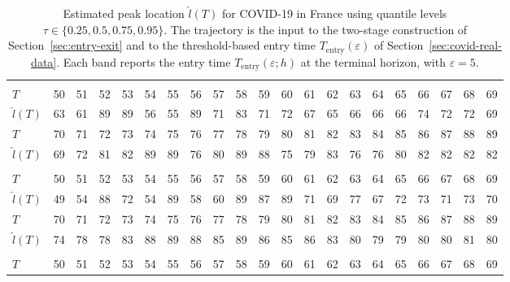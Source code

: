 \documentclass[12pt,a4paper]{article}
\begin{document}
	\begin{landscape}
		\begin{table}[htbp]
			\caption{Estimated peak location $\hat{l}(T)$ for COVID-19 in France using quantile levels $\tau\in\{0.25,0.5,0.75,0.95\}$. The trajectory is the input to the two-stage construction of Section~\ref{sec:entry-exit} and to the threshold-based entry time $T_{\mathrm{entry}}(\varepsilon)$ of Section~\ref{sec:covid-real-data}. Each band reports the entry time $T_{\mathrm{entry}}(\varepsilon;h)$ at the terminal horizon, with $\varepsilon=5$.}
			\label{tab:france_tau}
			\begin{tabular*}{\linewidth}{@{\extracolsep{\fill}}lrrrrrrrrrrrrrrrrrrrr}
				\toprule
				\addlinespace[2.5pt]
				\multicolumn{21}{c}{\textbf{$\tau=0.25,\ T_{\mathrm{entry}}(5)=85$}} \\
				\addlinespace[2.5pt]
				\midrule
				$T$ & 50 & 51 & 52 & 53 & 54 & 55 & 56 & 57 & 58 & 59 & 60 & 61 & 62 & 63 & 64 & 65 & 66 & 67 & 68 & 69 \\
				$\hat{l}(T)$ & 63 & 61 & 89 & 89 & 56 & 55 & 89 & 71 & 83 & 71 & 72 & 67 & 65 & 66 & 66 & 66 & 74 & 72 & 72 & 69 \\
				$T$ & 70 & 71 & 72 & 73 & 74 & 75 & 76 & 77 & 78 & 79 & 80 & 81 & 82 & 83 & 84 & 85 & 86 & 87 & 88 & 89 \\
				$\hat{l}(T)$ & 69 & 72 & 81 & 82 & 89 & 89 & 76 & 80 & 89 & 88 & 75 & 79 & 83 & 76 & 76 & 80 & 82 & 82 & 82 & 82 \\
				\midrule\addlinespace[2.5pt]
				\multicolumn{21}{c}{\textbf{$\tau=0.5,\ T_{\mathrm{entry}}(5)=82$}} \\
				\addlinespace[2.5pt]
				\midrule
				$T$ & 50 & 51 & 52 & 53 & 54 & 55 & 56 & 57 & 58 & 59 & 60 & 61 & 62 & 63 & 64 & 65 & 66 & 67 & 68 & 69 \\
				$\hat{l}(T)$ & 49 & 54 & 88 & 72 & 54 & 89 & 58 & 60 & 89 & 87 & 89 & 71 & 69 & 77 & 67 & 72 & 73 & 71 & 73 & 70 \\
				$T$ & 70 & 71 & 72 & 73 & 74 & 75 & 76 & 77 & 78 & 79 & 80 & 81 & 82 & 83 & 84 & 85 & 86 & 87 & 88 & 89 \\
				$\hat{l}(T)$ & 74 & 78 & 78 & 83 & 88 & 89 & 88 & 85 & 89 & 86 & 85 & 86 & 83 & 80 & 79 & 79 & 80 & 80 & 81 & 80 \\
				\midrule\addlinespace[2.5pt]
				\multicolumn{21}{c}{\textbf{$\tau=0.75,\ T_{\mathrm{entry}}(5)=80$}} \\
				\addlinespace[2.5pt]
				\midrule
				$T$ & 50 & 51 & 52 & 53 & 54 & 55 & 56 & 57 & 58 & 59 & 60 & 61 & 62 & 63 & 64 & 65 & 66 & 67 & 68 & 69 \\

\end{tabular*}
\end{table}
\end{landscape}
\end{document}
